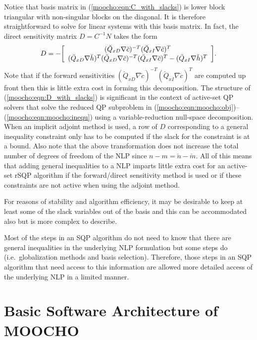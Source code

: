 \documentclass[pdf,ps2pdf,11pt]{SANDreport}
\begin{document}
Notice that basis matrix in (\ref{moocho:eqn:C_with_slacks}) is lower block
triangular with non-singular blocks on the diagonal.  It is therefore straightforward to solve
for linear systems with this basis matrix.  In fact, the direct sensitivity matrix
$D = C^{-1} N$ takes the form
%
\begin{equation}
D = - {\bmat{c}
	( \breve{Q}_{xD} \nabla \breve{c} )^{-T} ( \breve{Q}_{xI} \nabla \breve{c} )^{T} \\
    ( \breve{Q}_{xD} \nabla \breve{h} )^T ( \breve{Q}_{xD} \nabla \breve{c} )^{-T} ( \breve{Q}_{xI} \nabla \breve{c} )^{T}
      -( \breve{Q}_{xI} \nabla \breve{h} )^T
\emat}.
\label{moocho:eqn:D_with_slacks}
\end{equation}
%
Note that if the forward sensitivities $( \breve{Q}_{xD} {}\nabla {}\breve{c}
)^{-T} ( \breve{Q}_{xI} {}\nabla {}\breve{c} )^{T}$ are computed up front then
this is little extra cost in forming this decomposition.  The structure of
(\ref{moocho:eqn:D_with_slacks}) is significant in the context of active-set
QP solvers that solve the reduced QP subproblem in
(\ref{moocho:eqn:moocho:obj})--(\ref{moocho:eqn:moocho:inequ}) using a
variable-reduction null-space decomposition.  When an implicit adjoint method
is used, a row of $D$ corresponding to a general inequality constraint only
has to be computed if the slack for the constraint is at a bound.  Also note
that the above transformation does not increase the total number of degrees of
freedom of the NLP since $n-m = {}\breve{n}-\breve{m}$.  All of this means
that adding general inequalities to a NLP imparts little extra cost for an
active-set rSQP algorithm if the forward/direct sensitivity method is used or
if these constraints are not active when using the adjoint method.

For reasons of stability and algorithm efficiency, it may be desirable to keep
at least some of the slack variables out of the basis and this can be
accommodated also but is more complex to describe.

Most of the steps in an SQP algorithm do not need to know that there are
general inequalities in the underlying NLP formulation but some steps do
(i.e.\ globalization methods and basis selection).  Therefore, those steps in
an SQP algorithm that need access to this information are allowed more
detailed access of the underlying NLP in a limited manner.

%
\section{Basic Software Architecture of MOOCHO}
\label{moocho:sec:basic_software_design}
%
\end{document}
